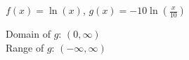 {$f(x) = \ln(x)$, $g(x) = -10\ln\left(\frac{x}{10}\right)$ \label{graphloglast} }
{Domain of $g$:  $(0, \infty)$\\
 Range of $g$:  $(-\infty, \infty)$\\

\begin{center}
\end{center}}



